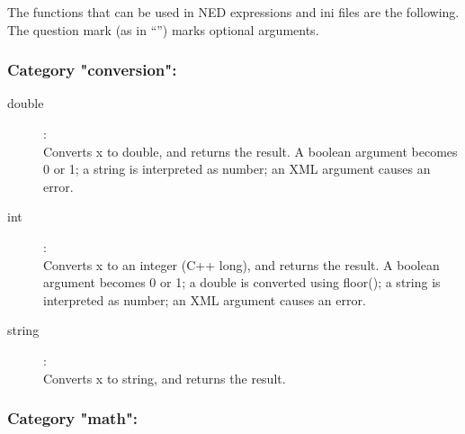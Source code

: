 \label{cha:ned-functions}

The functions that can be used in NED expressions and ini files are the
following. The question mark (as in ``'') marks optional arguments.

%
%

\subsubsection{Category "conversion":}
\label{sec:ned-functions:category-conversion}

\begin{description}
\item[double]:  \\
    Converts x to double, and returns the result. A boolean argument becomes 0 or 1; a string is interpreted as number; an XML argument causes an error.
\item[int]:  \\
    Converts x to an integer (C++ long), and returns the result. A boolean argument becomes 0 or 1; a double is converted using floor(); a string is interpreted as number; an XML argument causes an error.
\item[string]:  \\
    Converts x to string, and returns the result.

\end{description}

\subsubsection{Category "math":}
\label{sec:ned-functions:category-math}

